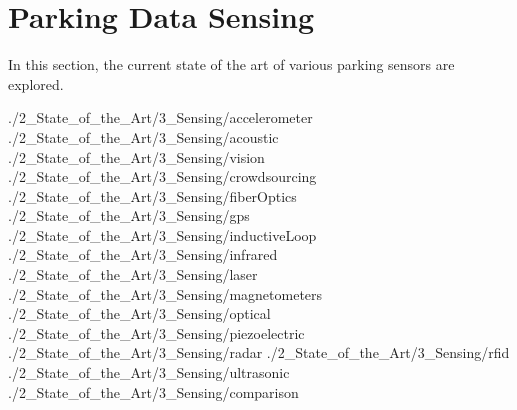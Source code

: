 \section{Parking Data Sensing}
In this section, the current state of the art of various parking sensors are explored.

{./2_State_of_the_Art/3_Sensing/accelerometer}
{./2_State_of_the_Art/3_Sensing/acoustic}
{./2_State_of_the_Art/3_Sensing/vision}
{./2_State_of_the_Art/3_Sensing/crowdsourcing}
{./2_State_of_the_Art/3_Sensing/fiberOptics}
{./2_State_of_the_Art/3_Sensing/gps}
{./2_State_of_the_Art/3_Sensing/inductiveLoop}
{./2_State_of_the_Art/3_Sensing/infrared}
{./2_State_of_the_Art/3_Sensing/laser}
{./2_State_of_the_Art/3_Sensing/magnetometers}
{./2_State_of_the_Art/3_Sensing/optical}
{./2_State_of_the_Art/3_Sensing/piezoelectric}
{./2_State_of_the_Art/3_Sensing/radar}
{./2_State_of_the_Art/3_Sensing/rfid}
{./2_State_of_the_Art/3_Sensing/ultrasonic}
{./2_State_of_the_Art/3_Sensing/comparison}
